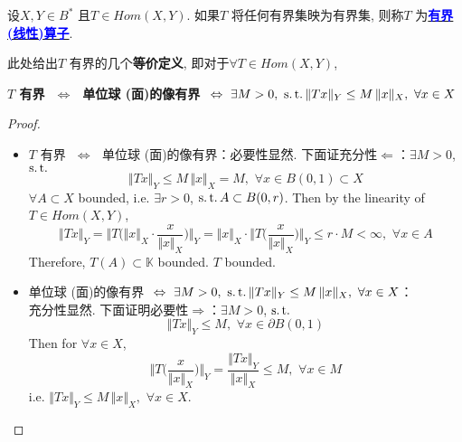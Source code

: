 	\begin{defn}\label{def 4.1.3}
		设$X , Y \in B^*$ 且$T \in Hom(X , Y)$. 如果$T$ 将任何有界集映为有界集, 则称$T$ 为\underline{\textcolor{blue}{\textbf{有界 (线性)算子}}}. 
		
		\vspace*{4em}
		
		\begin{rmk}
			此处给出$T$ 有界的几个\textbf{等价定义}, 即对于$\forall T \in Hom(X , Y)$, 
			\begin{center}
				\textbf{$T$ 有界 $\,\, \Leftrightarrow \,\, $ 单位球 (面)的像有界 $\,\, \Leftrightarrow \,\, \exists M > 0 , \,\, \operatorname{s.t.} \Vert T x \Vert_Y \leq M \, \Vert x \Vert_X , \,\, \forall x \in X$}
			\end{center}
			
			\vspace*{2em}
			
			\begin{proof}
				\begin{itemize}
					\item $T$ 有界 $\,\, \Leftrightarrow \,\, $ 单位球 (面)的像有界：必要性显然. 下面证充分性$\Leftarrow$：$\exists M > 0$, $\operatorname{s.t.}$
					\[ \Vert Tx \Vert_Y \leq M \, \Vert x \Vert_X = M , \,\, \forall x \in B(0 , 1) \subset X \]
					$\forall A \subset X$ bounded, i.e. $\exists r > 0$, $\operatorname{s.t.} A \subset B(0 , r)$. Then by the linearity of $T \in Hom(X , Y)$, 
					\[ \Vert T x \Vert_Y 
					= \Big\Vert T \Big( \Vert x \Vert_X \cdot \frac{x}{\Vert x \Vert_X} \Big) \Big\Vert_Y 
					= \Vert x \Vert_X \cdot \Big\Vert T \Big( \frac{x}{\Vert x \Vert_X} \Big) \Big\Vert_Y 
					\leq r \cdot M < \infty , \,\, \forall x \in A \]
					Therefore, $T(A) \subset \mathbb{K}$ bounded. $T$ bounded. 
					
					\vspace*{8em}
					
					\item 单位球 (面)的像有界 $\,\, \Leftrightarrow \,\, \exists M > 0 , \,\, \operatorname{s.t.} \Vert T x \Vert_Y \leq M \, \Vert x \Vert_X , \,\, \forall x \in X$：\\
					充分性显然. 下面证明必要性$\Rightarrow$：$\exists M > 0$, $\operatorname{s.t.}$
					\[ \Vert Tx \Vert_Y \leq M , \,\, \forall x \in \partial B(0 , 1) \]
					Then for $\forall x \in X$, 
					\[ \Big\Vert T\Big( \frac{x}{\Vert x \Vert_X} \Big) \Big\Vert_Y 
					= \frac{\Vert Tx \Vert_Y}{\Vert x \Vert_X}
					\leq M , \,\, \forall x \in M \]
					i.e. $\Vert Tx \Vert_Y \leq M \, \Vert x \Vert_X , \,\, \forall x \in X$.
				\end{itemize}
			\end{proof}
		\end{rmk}
	\end{defn}
	
